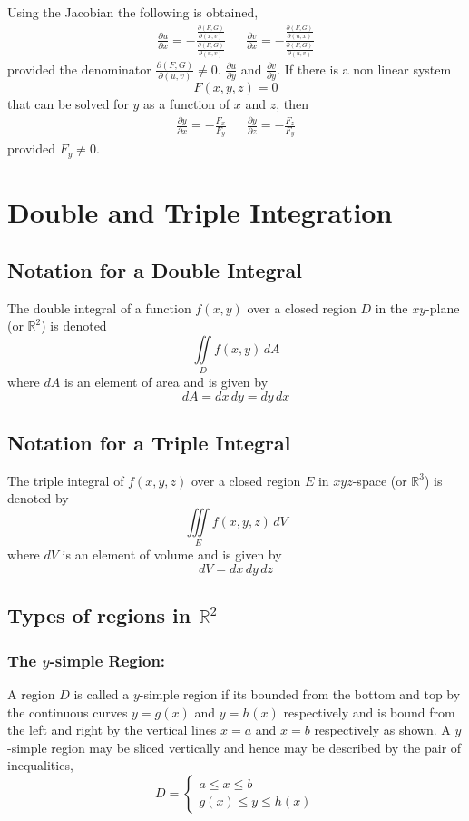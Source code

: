 \documentclass[14pt]{article}
\begin{document}
    Using the Jacobian the following is obtained,
    \begin{align*}
        \frac{\partial u}{\partial x}=-\frac{\frac{\partial(F, G)}{\partial (x, v)}}{\frac{\partial(F, G)}{\partial (u, v)}} &&
        \frac{\partial v}{\partial x}=-\frac{\frac{\partial(F, G)}{\partial (u, x)}}{\frac{\partial(F, G)}{\partial (u, v)}}
    \end{align*}
    provided the denominator $\frac{\partial(F, G)}{\partial (u, v)}\neq 0$. $\frac{\partial u}{\partial y}$ and $\frac{\partial v}{\partial y}$. If there is a non linear system
    $$F(x,y,z)=0$$
    that can be solved for $y$ as a function of $x$ and $z$, then
    \begin{align*}
        \frac{\partial y}{\partial x}=-\frac{F_x}{F_y} && \frac{\partial y}{\partial z}=-\frac{F_z}{F_y}
    \end{align*}
    provided $F_y\neq 0$. 
    \pagebreak
    \section{Double and Triple Integration}
    \subsection{Notation for a Double Integral}
    The double integral of a function $f(x,y)$ over a closed region $D$ in the $xy$-plane (or $\mathbb{R}^2$) is denoted 
    $$\iint\limits_D f(x,y)\, dA$$
    where $dA$ is an element of area and is given by
    $$dA=dx\, dy=dy\, dx$$
    \subsection{Notation for a Triple Integral}
    The triple integral of $f(x,y,z)$ over a closed region $E$ in $xyz$-space (or $\mathbb{R}^3$) is denoted by
    $$\iiint\limits_E f(x,y,z)\, dV$$
    where $dV$ is an element of volume and is given by
    $$dV=dx\, dy\, dz$$
    \subsection{Types of regions in $\mathbb{R}^2$}
    \subsubsection{The $y$-simple Region:}
    A region $D$ is called a $y$-simple region if its bounded from the bottom and top by the continuous curves $y=g(x)$ and $y=h(x)$ respectively and is bound from the left and right by the vertical lines $x=a$ and $x=b$ respectively as shown. A $y$-simple region may be sliced vertically and hence may be described by the pair of inequalities,
    $$D=\left\{\begin{array}{lr}
        a\leq x\leq b\\
        g(x)\leq y \leq h(x)
    \end{array}\right.$$
\end{document}
